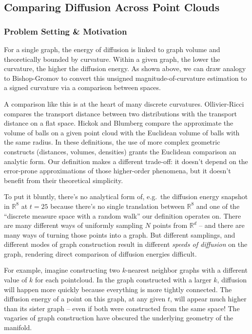 \documentclass[
  letterpaper,
  DIV=11,
  numbers=noendperiod]{scrartcl}
\theoremstyle{plain}
\theoremstyle{definition}
\theoremstyle{plain}
\theoremstyle{definition}
\theoremstyle{plain}
\theoremstyle{remark}
\begin{document}
\subsection{Comparing Diffusion Across Point
Clouds}\label{comparing-diffusion-across-point-clouds}

\subsubsection{Problem Setting \&
Motivation}\label{problem-setting-motivation}

For a single graph, the energy of diffusion is linked to graph volume
and theoretically bounded by curvature. Within a given graph, the lower
the curvature, the higher the diffusion energy. As shown above, we can
draw analogy to Bishop-Gromov to convert this unsigned
magnitude-of-curvature estimation to a signed curvature via a comparison
between spaces.

A comparison like this is at the heart of many discrete curvatures.
Ollivier-Ricci compares the transport distance between two distributions
with the transport distance on a flat space. Hickok and Blumberg compare
the approximate the volume of balls on a given point cloud with the
Euclidean volume of balls with the same radius. In these definitions,
the use of more complex geometric constructs (distances, volumes,
densities) grants the Euclidean comparison an analytic form. Our
definition makes a different trade-off: it doesn't depend on the
error-prone approximations of those higher-order phenomena, but it
doesn't benefit from their theoretical simplicity.

To put it bluntly, there's no analytical form of, e.g.~the diffusion
energy snapshot in \(\mathbb{R}^8\) at \(t=25\) because there's no
single translation between \(\mathbb{R}^8\) and one of the ``discrete
measure space with a random walk'' our definition operates on. There are
many different ways of uniformly sampling \(N\) points from
\(\mathbb{R}^d\) -- and there are many ways of turning those points into
a graph. But different samplings, and different modes of graph
construction result in different \emph{speeds of diffusion} on the
graph, rendering direct comparison of diffusion energies difficult.

For example, imagine constructing two \(k\)-nearest neighbor graphs with
a different value of \(k\) for each pointcloud. In the graph constructed
with a larger \(k\), diffusion will happen more quickly because
everything is more tightly connected. The diffusion energy of a point on
this graph, at any given \(t\), will appear much higher than its sister
graph -- even if both were constructed from the same space! The vagaries
of graph construction have obscured the underlying geometry of the
manifold.
\end{document}
